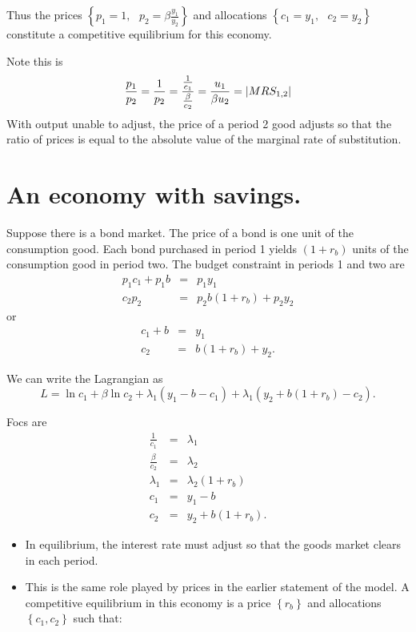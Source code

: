 \documentclass{sebase}
\begin{document}
Thus the prices $\left\{ p_{1}=1,\text{ }p_{2}=\beta \frac{y_{1}}{y_{2}}%
\right\} $ and allocations $\left\{ c_{1}=y_{1},\text{ }c_{2}=y_{2}\right\} $
constitute a competitive equilibrium for this economy.

Note this is 
\begin{equation*}
\frac{p_{1}}{p_{2}}=\frac{1}{p_{2}}=\frac{\frac{1}{c_{1}}}{\frac{\beta }{%
c_{2}}}=\frac{u_{1}}{\beta u_{2}}=\left\vert MRS_{1,2}\right\vert
\end{equation*}%
With output unable to adjust, the price of a period 2 good adjusts so that
the ratio of prices is equal to the absolute value of the marginal rate of
substitution. \pagebreak

\section{An economy with savings.}

Suppose there is a bond market. The price of a bond is one unit of the
consumption good. Each bond purchased in period 1 yields $\left(
1+r_{b}\right) $ units of the consumption good in period two. The budget
constraint in periods 1 and two are%
\begin{eqnarray*}
p_{1}c_{1}+p_{1}b &=&p_{1}y_{1} \\
c_{2}p_{2} &=&p_{2}b\left( 1+r_{b}\right) +p_{2}y_{2}
\end{eqnarray*}%
or%
\begin{eqnarray*}
c_{1}+b &=&y_{1} \\
c_{2} &=&b\left( 1+r_{b}\right) +y_{2}.
\end{eqnarray*}%
\pagebreak

We can write the Lagrangian as 
\begin{equation*}
L=\ln c_{1}+\beta \ln c_{2}+\lambda _{1}\left( y_{1}-b-c_{1}\right) +\lambda
_{1}\left( y_{2}+b\left( 1+r_{b}\right) -c_{2}\right) .
\end{equation*}

Focs are 
\begin{eqnarray*}
\frac{1}{c_{1}} &=&\lambda _{1} \\
\frac{\beta }{c_{2}} &=&\lambda _{2} \\
\lambda _{1} &=&\lambda _{2}\left( 1+r_{b}\right) \\
c_{1} &=&y_{1}-b \\
c_{2} &=&y_{2}+b\left( 1+r_{b}\right) .
\end{eqnarray*}%
\pagebreak

\begin{itemize}
\item In equilibrium, the interest rate must adjust so that the goods market
clears in each period.

\item This is the same role played by prices in the earlier statement of the
model. A competitive equilibrium in this economy is a price $\left\{
r_{b}\right\} $ and allocations $\left\{ c_{1},c_{2}\right\} $ such that:
\end{itemize}
\end{document}
